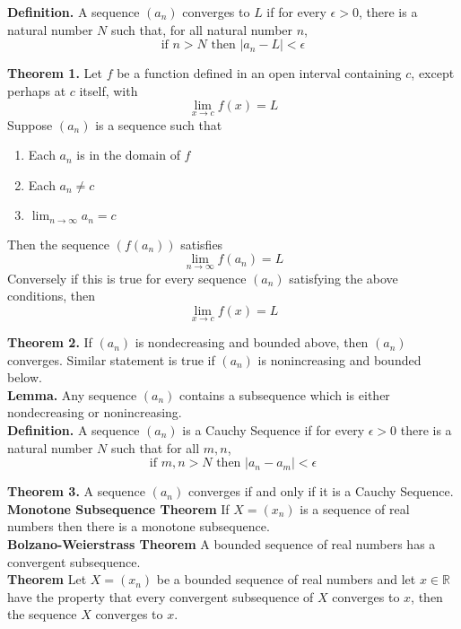 \documentclass[10pt,letterpaper]{article}
\begin{document}
	\textbf{Definition. } A sequence $(a_n)$ converges to $L$ if for every $\epsilon > 0$,
	there is a natural number $N$ such that, for all natural number $n$,
	$$\text{if } n > N \text{ then } |a_n - L| < \epsilon$$
	
	\textbf{Theorem 1. } Let $f$ be a function defined in an open interval containing $c$,
	except perhaps at $c$ itself, with 
	$$\displaystyle\lim_{x\to c}f(x) = L$$
	Suppose $(a_n)$ is a sequence such that 
	\begin{enumerate}[(1)]
		\item Each $a_n$ is in the domain of $f$
		\item Each $a_n \neq c$
		\item $\displaystyle\lim_{n\to \infty}a_n = c$
	\end{enumerate}
	Then the sequence $(f(a_n))$ satisfies
	$$\displaystyle\lim_{n\to \infty}f(a_n) = L$$
	Conversely if this is true for every sequence $(a_n)$ satisfying the above conditions, then
	$$\displaystyle\lim_{x\to c}f(x) = L$$
	
	\textbf{Theorem 2. } If $(a_n)$ is nondecreasing and bounded above, then $(a_n)$ converges.
	Similar statement is true if $(a_n)$ is nonincreasing and bounded below. \\
	
	\textbf{Lemma. } Any sequence $(a_n)$ contains a subsequence which is either nondecreasing or
	nonincreasing. \\
	
	\textbf{Definition. } A sequence $(a_n)$ is a Cauchy Sequence if for every $\epsilon > 0$ there is
	a natural number $N$ such that for all $m, n$,
	$$\text{if } m, n > N \text{ then } |a_n - a_m| < \epsilon$$
	
	\textbf{Theorem 3. } A sequence $(a_n)$ converges if and only if it is a Cauchy Sequence. \\
	
	\textbf{Monotone Subsequence Theorem}
	If $X = (x_n)$ is a sequence of real numbers then there is a monotone subsequence. \\
	
	\textbf{Bolzano-Weierstrass Theorem} A bounded sequence of real numbers has a convergent
	subsequence. \\
	
	\textbf{Theorem} Let $X = (x_n)$ be a bounded sequence of real numbers and let $x \in \mathbb{R}$ have
	the property that every convergent subsequence of $X$ converges to $x$, then the sequence $X$
	converges to $x$. \\
	
\end{document}
